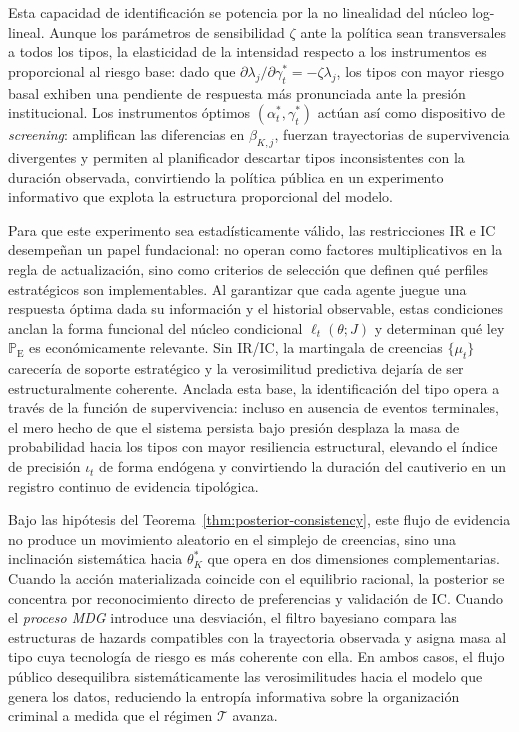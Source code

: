 \documentclass[12pt]{article}
\theoremstyle{definition}
\theoremstyle{remark}
\newcommand{\ProbE}{\mathbb{P}_{\mathrm{E}}}
\newcommand{\1}{\mathbf{1}}
\begin{document}
\medskip

\noindent Esta capacidad de identificación se potencia por la no linealidad del núcleo log-lineal. Aunque los parámetros de sensibilidad $\zeta$ ante la política sean transversales a todos los tipos, la elasticidad de la intensidad respecto a los instrumentos es proporcional al riesgo base: dado que $\partial \lambda_j / \partial \gamma_t^\ast = -\zeta \lambda_j$, los tipos con mayor riesgo basal exhiben una pendiente de respuesta más pronunciada ante la presión institucional. Los instrumentos óptimos $(\alpha_t^\ast, \gamma_t^\ast)$ actúan así como dispositivo de \textit{screening}: amplifican las diferencias en $\beta_{K,j}$, fuerzan trayectorias de supervivencia divergentes y permiten al planificador descartar tipos inconsistentes con la duración observada, convirtiendo la política pública en un experimento informativo que explota la estructura proporcional del modelo.

\medskip

\noindent Para que este experimento sea estadísticamente válido, las restricciones IR e IC desempeñan un papel fundacional: no operan como factores multiplicativos en la regla de actualización, sino como criterios de selección que definen qué perfiles estratégicos son implementables. Al garantizar que cada agente juegue una respuesta óptima dada su información y el historial observable, estas condiciones anclan la forma funcional del núcleo condicional $\ell_t(\theta; J)$ y determinan qué ley $\ProbE$ es económicamente relevante. Sin IR/IC, la martingala de creencias $\{\mu_t\}$ carecería de soporte estratégico y la verosimilitud predictiva dejaría de ser estructuralmente coherente. Anclada esta base, la identificación del tipo opera a través de la función de supervivencia: incluso en ausencia de eventos terminales, el mero hecho de que el sistema persista bajo presión desplaza la masa de probabilidad hacia los tipos con mayor resiliencia estructural, elevando el índice de precisión $\iota_t$ de forma endógena y convirtiendo la duración del cautiverio en un registro continuo de evidencia tipológica.

\medskip

\noindent Bajo las hipótesis del Teorema~\ref{thm:posterior-consistency}, este flujo de evidencia no produce un movimiento aleatorio en el simplejo de creencias, sino una inclinación sistemática hacia $\theta_K^\ast$ que opera en dos dimensiones complementarias. Cuando la acción materializada coincide con el equilibrio racional, la posterior se concentra por reconocimiento directo de preferencias y validación de IC. Cuando el \textit{proceso MDG} introduce una desviación, el filtro bayesiano compara las estructuras de hazards compatibles con la trayectoria observada y asigna masa al tipo cuya tecnología de riesgo es más coherente con ella. En ambos casos, el flujo público desequilibra sistemáticamente las verosimilitudes hacia el modelo que genera los datos, reduciendo la entropía informativa sobre la organización criminal a medida que el régimen $\mathcal{T}$ avanza.
\end{document}
